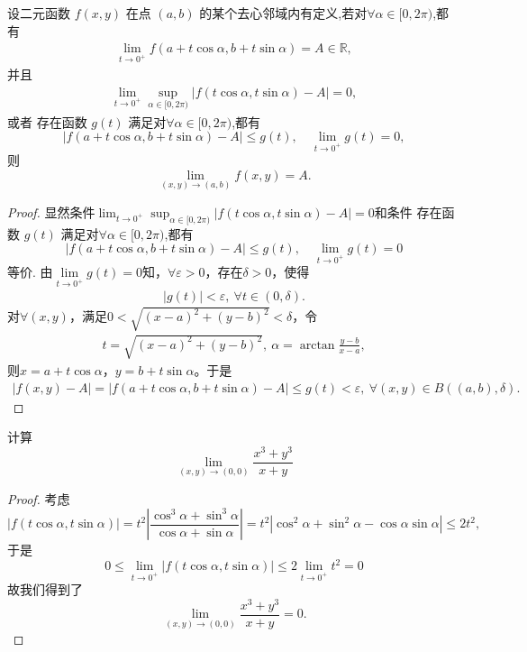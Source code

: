 \documentclass[../../main.tex]{subfiles}%
\begin{document}
\begin{proposition}\label{proposition:二重极限极坐标换元的条件}
设二元函数 \( f(x, y) \) 在点 \( (a, b) \) 的某个去心邻域内有定义,若对$\forall \alpha \in [0, 2\pi)$,都有
\begin{align*}
\underset{t \rightarrow 0^+}{\lim}f\left( a+t\cos \alpha ,b+t\sin \alpha \right) =A\in \mathbb{R},
\end{align*}
并且
\begin{align*}
\lim_{t \to 0^+} \sup_{\alpha \in [0,2\pi)} |f(t\cos\alpha, t\sin\alpha) - A| = 0,
\end{align*}
或者
存在函数 \(g(t)\) 满足对$\forall \alpha \in [0, 2\pi)$,都有
\[
|f(a + t\cos\alpha, b + t\sin\alpha) - A| \leqslant g(t),\quad \lim_{t \to 0^+} g(t) = 0,
\]
则
\[
\lim_{(x, y) \to (a, b)} f(x, y) = A.
\]
\end{proposition}
\begin{proof}
显然条件$\lim_{t \to 0^+} \sup_{\alpha \in [0,2\pi)} |f(t\cos\alpha, t\sin\alpha) - A| = 0$和条件
存在函数 \(g(t)\) 满足对$\forall \alpha \in [0, 2\pi)$,都有
\[
|f(a + t\cos\alpha, b + t\sin\alpha) - A| \leqslant g(t),\quad \lim_{t \to 0^+} g(t) = 0
\]
等价.
由$\lim\limits_{t\rightarrow 0^+}g\left( t \right) =0$知，$\forall \varepsilon >0$，存在$\delta >0$，使得
\begin{align*}
|g(t)| < \varepsilon,\ \forall t \in (0, \delta).
\end{align*}
对$\forall (x, y)$，满足$0 < \sqrt{(x - a)^2 + (y - b)^2} < \delta$，令
\begin{align*}
t = \sqrt{(x - a)^2 + (y - b)^2},\ \alpha = \arctan\frac{y - b}{x - a},
\end{align*}
则$x = a + t\cos\alpha$，$y = b + t\sin\alpha$。于是
\begin{align*}
|f(x, y) - A| = |f(a + t\cos\alpha, b + t\sin\alpha) - A| \leqslant g(t) < \varepsilon,\ \forall (x, y) \in B\left( (a, b), \delta \right).
\end{align*}
\end{proof}

\begin{example}
计算
\[
\lim_{(x,y) \to (0,0)} \frac{x^3 + y^3}{x + y}
\]
\end{example}
\begin{proof}
考虑
\[
|f(t\cos\alpha, t\sin\alpha)| = t^2 \left| \frac{\cos^3 \alpha + \sin^3 \alpha}{\cos\alpha + \sin\alpha} \right| = t^2 |\cos^2 \alpha + \sin^2 \alpha - \cos\alpha \sin\alpha| \leqslant 2t^2,
\]
于是
\[
0 \leqslant \lim_{t \to 0^+} |f(t\cos\alpha, t\sin\alpha)| \leqslant 2 \lim_{t \to 0^+} t^2 = 0
\]
故我们得到了
\[
\lim_{(x,y) \to (0,0)} \frac{x^3 + y^3}{x + y} = 0.
\]
\end{proof}
\end{document}
